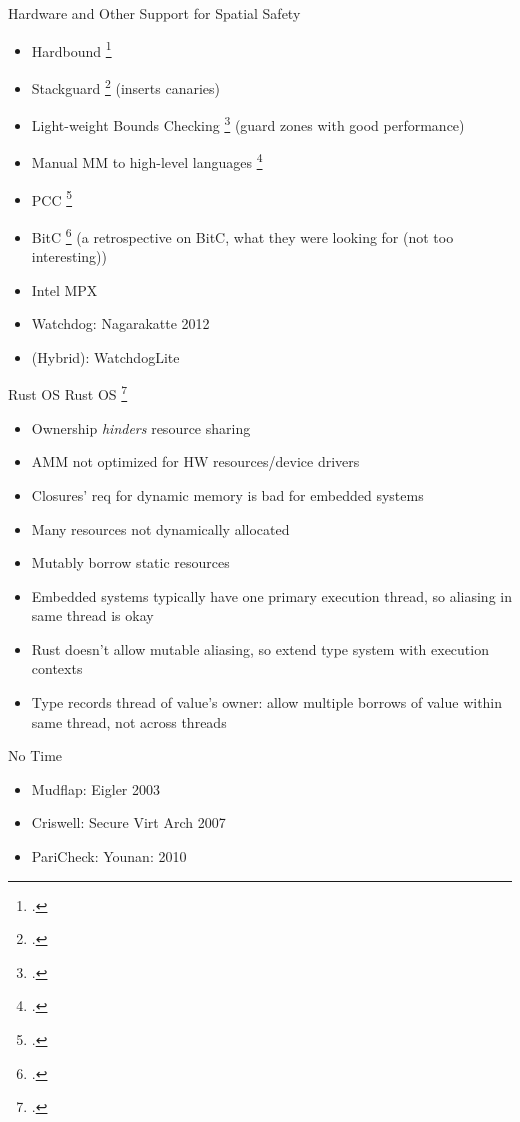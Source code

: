 \begin{frame}{Hardware and Other Support for Spatial Safety}
\begin{itemize}
    \item Hardbound \footcite{devietti_hardbound:_2008}
    \item Stackguard \footcite{cowan_stackguard:_1998} (inserts canaries)
    \item Light-weight Bounds Checking \footcite{hasabnis_light-weight_2012} (guard zones with good performance)
    \item Manual MM to high-level languages \footcite{kedia_simple_2017}
    \item PCC \footcite{necula_proof-carrying_1997}
    \item BitC \footcite{shapiro_origins_2008} (a retrospective on BitC, what they were looking for (not too interesting))
    \item Intel MPX %
    \item Watchdog: Nagarakatte 2012
    \item (Hybrid): WatchdogLite
\end{itemize}
\end{frame}


\begin{frame}{Rust OS}
\footnotesize
Rust OS \footcite{levy_ownership_2015}
    \begin{itemize}
        \item Ownership \emph{hinders} resource sharing
        \item AMM not optimized for HW resources/device drivers
        \item Closures' req for dynamic memory is bad for embedded systems
        \item Many resources not dynamically allocated
        \item Mutably borrow static resources
        \item Embedded systems typically have one primary execution thread, so aliasing in same thread is okay
        \item Rust doesn't allow mutable aliasing, so extend type system with \alert{execution contexts}
        \item Type records thread of value's owner: allow multiple borrows of value within same thread, not across threads
    \end{itemize}
\end{frame}

\begin{frame}{No Time}
\begin{itemize}
  \item Mudflap: Eigler 2003
  \item Criswell: Secure Virt Arch 2007
  \item PariCheck: Younan: 2010
\end{itemize}
\end{frame}

